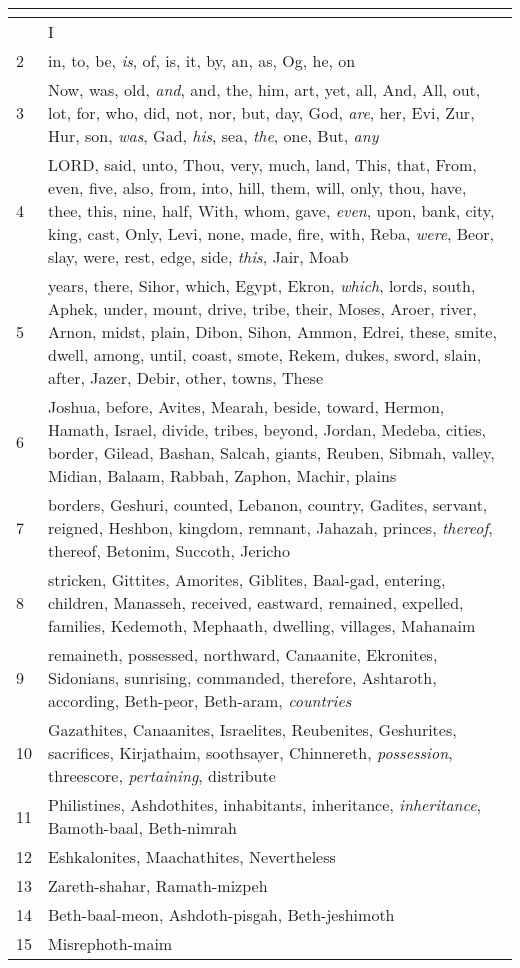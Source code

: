 \begin{center}
\begin{longtable}{l|p{3.75in}}
\hline \multicolumn{2}{c}{{ }} \\ \hline
\endfoot 
1 & I\\ \hline 
2 & in, to, be, \emph{is}, of, is, it, by, an, as, Og, he, on\\ \hline 
3 & Now, was, old, \emph{and}, and, the, him, art, yet, all, And, All, out, lot, for, who, did, not, nor, but, day, God, \emph{are}, her, Evi, Zur, Hur, son, \emph{was}, Gad, \emph{his}, sea, \emph{the}, one, But, \emph{any}\\ \hline 
4 & LORD, said, unto, Thou, very, much, land, This, that, From, even, five, also, from, into, hill, them, will, only, thou, have, thee, this, nine, half, With, whom, gave, \emph{even}, upon, bank, city, king, cast, Only, Levi, none, made, fire, with, Reba, \emph{were}, Beor, slay, were, rest, edge, side, \emph{this}, Jair, Moab\\ \hline 
5 & years, there, Sihor, which, Egypt, Ekron, \emph{which}, lords, south, Aphek, under, mount, drive, tribe, their, Moses, Aroer, river, Arnon, midst, plain, Dibon, Sihon, Ammon, Edrei, these, smite, dwell, among, until, coast, smote, Rekem, dukes, sword, slain, after, Jazer, Debir, other, towns, These\\ \hline 
6 & Joshua, before, Avites, Mearah, beside, toward, Hermon, Hamath, Israel, divide, tribes, beyond, Jordan, Medeba, cities, border, Gilead, Bashan, Salcah, giants, Reuben, Sibmah, valley, Midian, Balaam, Rabbah, Zaphon, Machir, plains\\ \hline 
7 & borders, Geshuri, counted, Lebanon, country, Gadites, servant, reigned, Heshbon, kingdom, remnant, Jahazah, princes, \emph{thereof}, thereof, Betonim, Succoth, Jericho\\ \hline 
8 & stricken, Gittites, Amorites, Giblites, Baal-gad, entering, children, Manasseh, received, eastward, remained, expelled, families, Kedemoth, Mephaath, dwelling, villages, Mahanaim\\ \hline 
9 & remaineth, possessed, northward, Canaanite, Ekronites, Sidonians, sunrising, commanded, therefore, Ashtaroth, according, Beth-peor, Beth-aram, \emph{countries}\\ \hline 
10 & Gazathites, Canaanites, Israelites, Reubenites, Geshurites, sacrifices, Kirjathaim, soothsayer, Chinnereth, \emph{possession}, threescore, \emph{pertaining}, distribute\\ \hline 
11 & Philistines, Ashdothites, inhabitants, inheritance, \emph{inheritance}, Bamoth-baal, Beth-nimrah\\ \hline 
12 & Eshkalonites, Maachathites, Nevertheless\\ \hline 
13 & Zareth-shahar, Ramath-mizpeh\\ \hline 
14 & Beth-baal-meon, Ashdoth-pisgah, Beth-jeshimoth\\ \hline 
15 & Misrephoth-maim\\ \hline 
\end{longtable}
\end{center}






